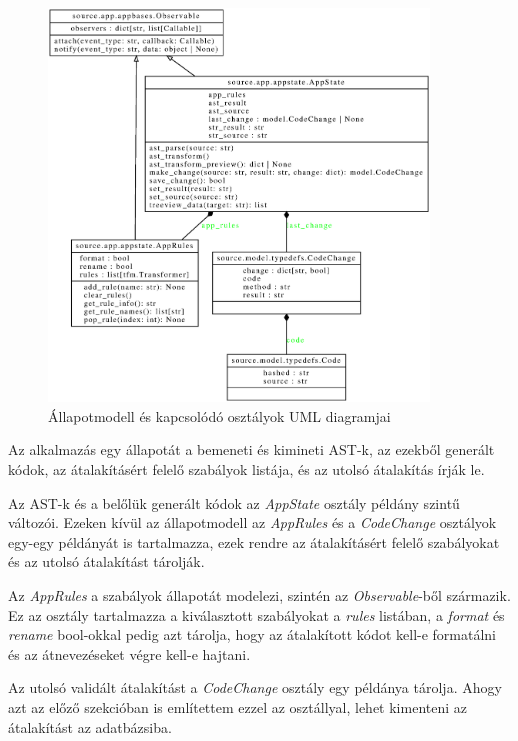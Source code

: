 \begin{figure}[H]
	\centering
	\includegraphics[width=0.9\textwidth]{images/uml/appstate.eps}
	\caption{Állapotmodell és kapcsolódó osztályok UML diagramjai}
\end{figure}

Az alkalmazás egy állapotát a bemeneti és kimineti AST-k, az ezekből generált kódok,
az átalakításért felelő szabályok listája, és az utolsó átalakítás írják le.

Az AST-k és a belőlük generált kódok az \emph{AppState} osztály példány szintű változói.
Ezeken kívül az állapotmodell az \emph{AppRules} és a \emph{CodeChange} osztályok egy-egy
példányát
is tartalmazza, ezek rendre az átalakításért felelő szabályokat és az utolsó átalakítást
tárolják.

Az \emph{AppRules} a szabályok állapotát modelezi, szintén az \emph{Observable}-ből
származik.
Ez az osztály tartalmazza a kiválasztott szabályokat a \emph{rules} listában,
a \emph{format} és \emph{rename} bool-okkal pedig azt tárolja, hogy az átalakított
kódot kell-e formatálni és az átnevezéseket végre kell-e hajtani.

\pagebreak

Az utolsó validált átalakítást a \emph{CodeChange} osztály egy példánya tárolja.
Ahogy azt az előző szekcióban is említettem ezzel az osztállyal,
lehet kimenteni az átalakítást az adatbázsiba.

